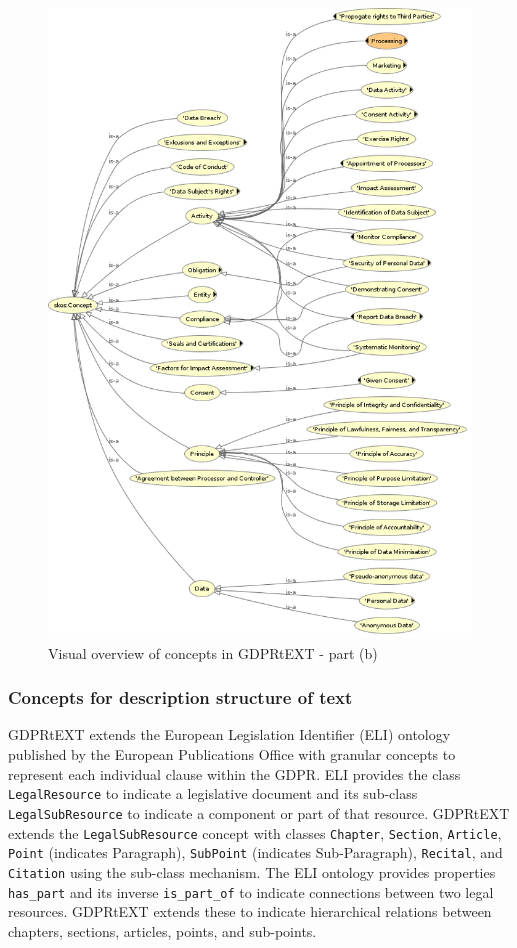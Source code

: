 \begin{figure}[htbp]
    \centering
    \includegraphics[width=0.75\linewidth]{img/gdprtext-summary-b}
    \caption{Visual overview of concepts in GDPRtEXT - part (b) \cite{pandit_gdprtext_2018}}
    \label{fig:vocab:gdprtext-summary-b}
\end{figure}

\subsubsection{Concepts for description structure of text}
GDPRtEXT extends the European Legislation Identifier (ELI) \cite{thomas_european_2019} ontology published by the European Publications Office with granular concepts to represent each individual clause within the GDPR. 
ELI provides the class \texttt{LegalResource} to indicate a legislative document and its sub-class \texttt{LegalSubResource} to indicate a component or part of that resource. GDPRtEXT extends the \texttt{LegalSubResource} concept with classes \texttt{Chapter}, \texttt{Section}, \texttt{Article}, \texttt{Point} (indicates Paragraph), \texttt{SubPoint} (indicates Sub-Paragraph), \texttt{Recital}, and \texttt{Citation} using the sub-class mechanism.
The ELI ontology provides properties \texttt{has\_part} and its inverse \texttt{is\_part\_of} to indicate connections between two legal resources. GDPRtEXT extends these to indicate hierarchical relations between chapters, sections, articles, points, and sub-points.


